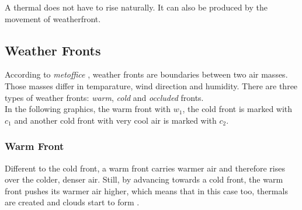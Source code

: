 \noindent
A \gls{thermal} does not have to rise naturally. It can also be produced by the movement of \gls{weatherfront}.

\clearpage

\subsection{Weather Fronts}
According to \emph{metoffice} \cite{metoffice:weatherfronts}, weather fronts are boundaries between two air masses. Those masses differ in temparature, wind direction and humidity.
There are three types of weather fronts: \emph{warm}, \emph{cold} and \emph{occluded} fronts.
\\
In the following graphics, the warm front with \color{red}$w_1$\color{black}, the cold front is marked with \color{cyan}$c_1$ \color{black} and another cold front with very cool air is marked with \color{darkcyan}$c_2$\color{black}.

\subsubsection{Warm Front}
Different to the cold front, a warm front carries warmer air and therefore rises over the colder, denser air.
Still, by advancing towards a cold front, the warm front pushes its warmer air higher,
which means that in this case too, \gls{thermal}s are created and clouds start to form \cite{ww2010:warmfront}.

